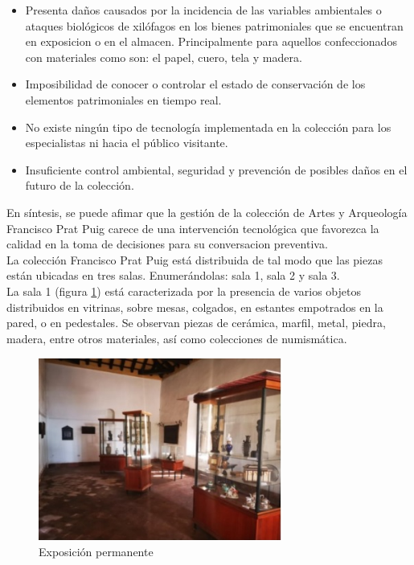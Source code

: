     \begin{itemize}
        \item Presenta daños causados por la incidencia de las variables ambientales o ataques biológicos de xilófagos en los bienes patrimoniales que se encuentran en exposicion o en el almacen. Principalmente para aquellos confeccionados con materiales como son: el papel, cuero, tela y madera.
        \item Imposibilidad de conocer o controlar el estado de conservación de los elementos patrimoniales en tiempo real.
        \item No existe ningún tipo de tecnología implementada en la colección para los especialistas ni hacia el público visitante.
        \item Insuficiente control ambiental, seguridad y prevención de posibles daños en el futuro de la colección.
    \end{itemize}

    En síntesis, se puede afimar que la gestión de la colección de Artes y Arqueología Francisco Prat Puig carece de una intervención tecnológica que favorezca la calidad en la toma de decisiones para su conversacion preventiva.\\

    La colección Francisco Prat Puig está distribuida de tal modo que las piezas están ubicadas en tres salas. Enumerándolas: sala 1, sala 2 y sala 3.\\
    La sala 1 (figura \ref{imag:sala_1}) está caracterizada por la presencia de varios objetos distribuidos en vitrinas, sobre mesas, colgados, en estantes empotrados en la pared, o en pedestales. Se observan piezas de cerámica, marfil, metal, piedra, madera, entre otros materiales, así como colecciones de numismática.\newline
    
    \begin{figure}[H]
        \centering
        \includegraphics[width=8cm, height=6cm]{imagenes/sala_1.jpg}
        \caption{Exposición permanente}
        \label{imag:sala_1}
    \end{figure}

